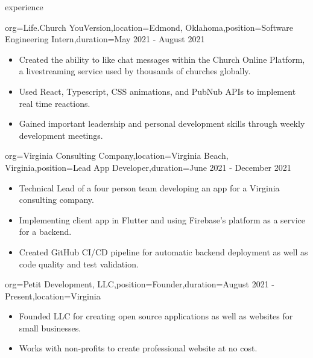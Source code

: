 \documentclass{resume}
\begin{document}
\begin{ResumeSection}{experience}
    \begin{ResumeSubsection}{org={Life.Church YouVersion},location={Edmond, Oklahoma},position={Software Engineering Intern},duration={May 2021 - August 2021}}
        \begin{itemize}
            \item {Created the ability to like chat messages within
                    the Church Online Platform, a livestreaming service used by
                thousands of churches globally.}
            \item {Used React, Typescript, CSS animations, and
                PubNub APIs to implement real time reactions.}
            \item Gained important leadership and personal development skills
                through weekly development meetings.
        \end{itemize}
    \end{ResumeSubsection}

    \begin{ResumeSubsection}{org={Virginia Consulting Company},location={Virginia Beach, Virginia},position={Lead App Developer},duration={June 2021 - December 2021}}
        \begin{itemize}
            \item {Technical Lead of a four person team developing an app for a Virginia consulting company.}
            \item {Implementing client app in Flutter and using Firebase's platform as a service for a backend.}
            \item {Created GitHub CI/CD pipeline for automatic backend deployment as well as code quality and test validation.}
        \end{itemize}
    \end{ResumeSubsection}

    \begin{ResumeSubsection}{org={Petit Development, LLC},position={Founder},duration={August 2021 - Present},location={Virginia}}
        \begin{itemize}
            \item Founded LLC for creating open source applications as well as
                websites for small businesses.
            \item Works with non-profits to create professional website at no cost.
        \end{itemize}
    \end{ResumeSubsection}


\end{ResumeSection}
\end{document}
